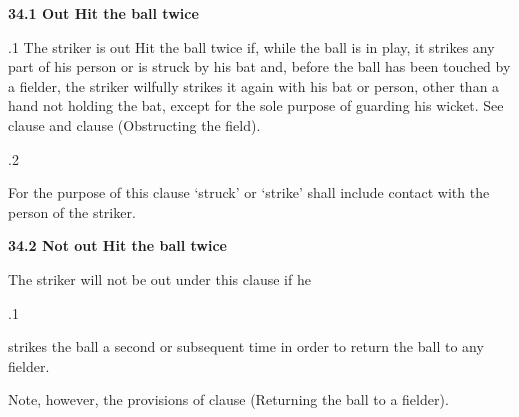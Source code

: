 \documentclass[12pt]{article}
\begin{document}
\vspace{\baselineskip}
{\fontsize{11pt}{13.2pt}\selectfont \textbf{34.1 \tabto{0.47in} Out Hit the ball twice}\par}\par


\vspace{\baselineskip}
\begin{adjustwidth}{0.5in}{0.0in}
{\fontsize{9pt}{10.8pt}.1 \tabto{0.49in} The striker is out Hit the ball twice if, while the ball is in play, it strikes any part of his person or is struck by his bat and, before the ball has been touched by a fielder, the striker wilfully strikes it again with his bat or person, other than a hand not holding the bat, except for the sole purpose of guarding his wicket. See clause and clause (Obstructing the field).\par}\par

\end{adjustwidth}


\vspace{\baselineskip}
{\fontsize{9pt}{10.8pt}.2 \tabto{0.49in} {\fontsize{8pt}{9.6pt}\selectfont For the purpose of this clause ‘struck’ or ‘strike’ shall include contact with the person of the striker.\par}\par}\par


\vspace{\baselineskip}
{\fontsize{11pt}{13.2pt}\selectfont \textbf{34.2 \tabto{0.47in} Not out Hit the ball twice}\par}\par


\vspace{\baselineskip}
{\fontsize{9pt}{10.8pt}\selectfont The striker will not be out under this clause if he\par}\par


\vspace{\baselineskip}
{\fontsize{9pt}{10.8pt}.1 \tabto{0.49in} {\fontsize{8pt}{9.6pt}\selectfont strikes the ball a second or subsequent time in order to return the ball to any fielder.\par}\par}\par


\vspace{\baselineskip}
\begin{adjustwidth}{0.5in}{0.0in}
{\fontsize{9pt}{10.8pt}\selectfont Note, however, the provisions of clause (Returning the ball to a fielder).\par}\par

\end{adjustwidth}
\end{document}
